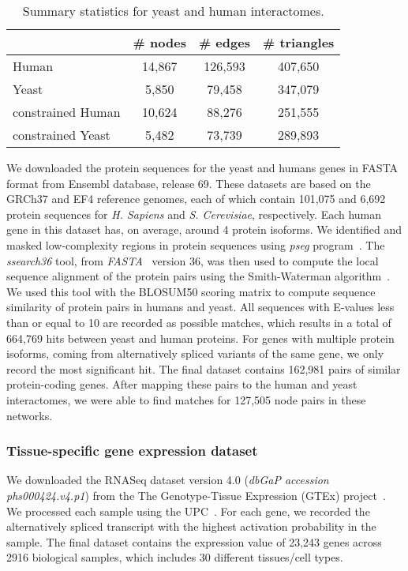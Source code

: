 \documentclass[10pt, journal, compsoc, final]{IEEEtran}
\begin{document}
\begin{table}[!t]
\caption{Summary statistics for yeast and human interactomes.}
\label{table:netStats}
\centering
\begin{tabular}{lccc}
\toprule
	&\# nodes	&\# edges	&\# triangles\\	\midrule
Human	&14,867	&126,593	&407,650\\
Yeast	&5,850	&79,458	&347,079\\ 
\addlinespace
constrained Human & 10,624 & 88,276 & 251,555\\
constrained Yeast & 5,482 & 73,739 & 289,893 \\
\bottomrule
\end{tabular}
\end{table}

We downloaded the protein sequences for the yeast and 
humans genes in FASTA format from Ensembl database, release 69. These datasets are based on the GRCh37 
and EF4 reference genomes, each of which contain 101,075 and 6,692 protein sequences for 
\textit{H. Sapiens} and \textit{S. Cerevisiae}, respectively. Each human gene in this dataset has, 
on average, around 4 protein isoforms. We identified and masked low-complexity regions in protein 
sequences using \textit{pseg} program~\cite{PSEG}. The \textit{ssearch36} tool, from 
\textit{FASTA}~\cite{FASTA} version 36, was then used to compute the local sequence alignment of 
the protein pairs using the Smith-Waterman algorithm~\cite{Smith1981}. We used this tool with the 
BLOSUM50 scoring matrix to compute sequence similarity of protein pairs in humans and yeast. All 
sequences with E-values less than or equal to 10 are recorded as possible matches, which results 
in a total of 664,769 hits between yeast and human proteins. For genes with multiple protein 
isoforms, coming from alternatively spliced variants of the same gene, we only record the most 
significant hit. The final dataset contains 162,981 pairs of similar protein-coding genes. After 
mapping these pairs to the human and yeast interactomes, we were able to find matches for 127,505 
node pairs in these networks. 



\subsubsection{Tissue-specific gene expression dataset}

We downloaded the RNASeq dataset version 4.0 (\textit{dbGaP accession phs000424.v4.p1}) from the The Genotype-Tissue Expression (GTEx) project~\cite{Ardlie2015}. We processed each sample using the UPC~\cite{Piccolo2013}. For each gene, we recorded the alternatively spliced transcript with the highest activation probability in the sample. The final dataset contains the expression value of 23,243 genes across 2916 biological samples, which includes 30 different tissues/cell types.
\end{document}
